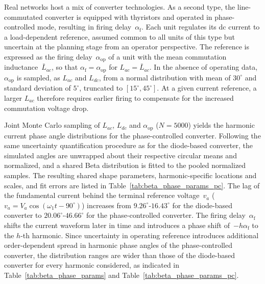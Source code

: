 Real networks host a mix of converter technologies. As a second type, the line-commutated converter is equipped with thyristors and operated in phase-controlled mode, resulting in firing delay~$\alpha_{\text{f}}$. Each unit regulates its dc current to a load-dependent reference, assumed common to all units of this type but uncertain at the planning stage from an operator perspective. The reference is expressed as the firing delay~$\alpha_{\text{op}}$ of a unit with the mean commutation inductance~$\bar{L}_{ac}$, so that $\alpha_{\text{f}} = \alpha_{\text{op}}$ for $L_{ac} = \bar{L}_{ac}$. In the absence of operating data, $\alpha_{\text{op}}$ is sampled, as $L_{ac}$ and $L_{dc}$, from a normal distribution with mean of $30^{\circ}$ and standard deviation of $5^{\circ}$, truncated to $[15^{\circ}, 45^{\circ}]$.
At a given current reference, a larger $L_{ac}$ therefore requires earlier firing to compensate for the increased commutation voltage drop.

Joint Monte Carlo sampling of $L_{ac}$, $L_{dc}$ and $\alpha_{\text{op}}$ ($N = 5000$) yields the harmonic current phase angle distributions for the phase-controlled converter. Following the same uncertainty quantification procedure as for the diode-based converter, the simulated angles are unwrapped about their respective circular means and normalized, and a shared Beta distribution is fitted to the pooled normalized samples. The resulting shared shape parameters, harmonic-specific locations and scales, and fit errors are listed in Table~\ref{tab:beta_phase_params_pc}.
The lag of the fundamental current behind the terminal reference voltage~$v_a$ ($v_a = V_a\cos(\omega_1 t - 90^{\circ})$) increases from $9.26^{\circ}$-$16.43^{\circ}$ for the diode-based converter to $20.06^{\circ}$-$46.66^{\circ}$ for the phase-controlled converter. The firing delay~$\alpha_{\text{f}}$ shifts the current waveform later in time and introduces a phase shift of~$-h\alpha_{\text{f}}$ to the $h$-th harmonic. Since uncertainty in operating reference introduces additional order-dependent spread in harmonic phase angles of the phase-controlled converter, the distribution ranges are wider than those of the diode-based converter for every harmonic considered, as indicated in Table~\ref{tab:beta_phase_params} and Table~\ref{tab:beta_phase_params_pc}.

